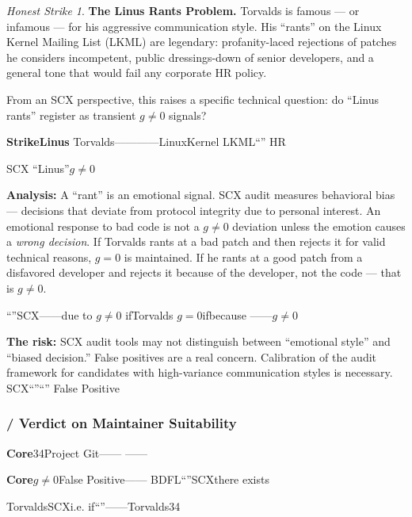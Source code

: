 \documentclass[12pt,a4paper]{article}
\theoremstyle{remark}
\newtheorem{honesthit}{Honest Strike}[section]
\newenvironment{hitbox}{%
  \begin{center}
  \color{critiquered}
  \begin{minipage}{0.92\textwidth}
  \begin{honesthit}
}{%
  \end{honesthit}
  \end{minipage}
  \end{center}
}
\begin{document}
\begin{hitbox}
\textbf{The Linus Rants Problem.}
Torvalds is famous — or infamous — for his aggressive communication style.
His ``rants'' on the Linux Kernel Mailing List (LKML) are legendary:
profanity-laced rejections of patches he considers incompetent, public
dressings-down of senior developers, and a general tone that would fail
any corporate HR policy.

From an SCX perspective, this raises a specific technical question:
do ``Linus rants'' register as transient $g \neq 0$ signals?

\textbf{StrikeLinus}
Torvalds————LinuxKernel
LKML“”
HR

SCX
“Linus”$g \neq 0$

\textbf{Analysis:} A ``rant'' is an emotional signal. SCX audit measures
behavioral bias — decisions that deviate from protocol integrity due to
personal interest. An emotional response to bad code is not a $g \neq 0$
deviation unless the emotion causes a \textit{wrong decision}. If Torvalds
rants at a bad patch and then rejects it for valid technical reasons, $g=0$
is maintained. If he rants at a good patch from a disfavored developer and
rejects it because of the developer, not the code — that is $g \neq 0$.

\textbf{}“”SCX——due to
$g \neq 0$
\textit{}ifTorvalds
$g=0$ifbecause
——$g \neq 0$

\textbf{The risk:} SCX audit tools may not distinguish between ``emotional
style'' and ``biased decision.'' False positives are a real concern.
Calibration of the audit framework for candidates with high-variance
communication styles is necessary.
\textbf{}SCX“”“”
False Positive

\end{hitbox}

\subsubsection{ / Verdict on Maintainer Suitability}

\begin{verdictbox}
\textbf{Core}34Project
Git——
——

\textbf{Core}$g \neq 0$False Positive——
BDFL“”SCXthere exists


\textbf{}TorvaldsSCXi.e.
if“”——Torvalds34

\end{verdictbox}

\newpage
\end{document}

